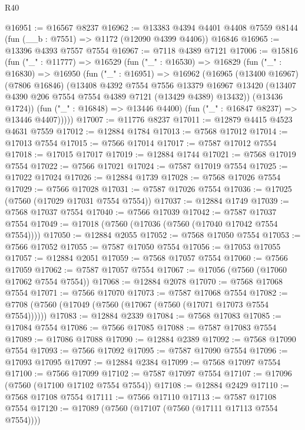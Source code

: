 \begin{lexlean}{R40}
\begin{coremodule}
@16951 := @16567 @8237
@16962 := @13383
    @4394
    @4401
    @4408
    @7559
    @8144
    (fun (__b : @7551) => @1172 (@12090 @4399 @4406))
    @16846
@16965 := @13396 @4393 @7557 @7554
@16967 := @7118 @4389 @7121
@17006 := @15816
    (fun ("_" : @11777) =>
    @16529
      (fun ("_" : @16530) =>
      @16829
        (fun ("_" : @16830) =>
        @16950
          (fun ("_" : @16951) =>
          @16962
            (@16965
              (@13400 @16967)
              (@7806 @16846)
              (@13408
                @4392
                @7554
                @7556
                @13379
                @16967
                @13420
                (@13407 @4390 @206 @7554 @7554 @4389 @7121 (@13429 @4389) @13432))
              (@13436 @1724))
            (fun ("_" : @16848) => @13446 @4400)
            (fun ("_" : @16847 @8237) => @13446 @4407)))))
@17007 := @11776 @8237
@17011 := @12879 @4415 @4523 @4631 @7559
@17012 := @12884 @1784
@17013 := @7568 @17012
@17014 := @17013 @7554
@17015 := @7566 @17014
@17017 := @7587 @17012 @7554
@17018 := @17015 @17017
@17019 := @12884 @1744
@17021 := @7568 @17019 @7554
@17022 := @7566 @17021
@17024 := @7587 @17019 @7554
@17025 := @17022 @17024
@17026 := @12884 @1739
@17028 := @7568 @17026 @7554
@17029 := @7566 @17028
@17031 := @7587 @17026 @7554
@17036 := @17025 (@7560 (@17029 @17031 @7554 @7554))
@17037 := @12884 @1749
@17039 := @7568 @17037 @7554
@17040 := @7566 @17039
@17042 := @7587 @17037 @7554
@17049 := @17018 (@7560 (@17036 (@7560 (@17040 @17042 @7554 @7554))))
@17050 := @12884 @2055
@17052 := @7568 @17050 @7554
@17053 := @7566 @17052
@17055 := @7587 @17050 @7554
@17056 := @17053 @17055
@17057 := @12884 @2051
@17059 := @7568 @17057 @7554
@17060 := @7566 @17059
@17062 := @7587 @17057 @7554
@17067 := @17056 (@7560 (@17060 @17062 @7554 @7554))
@17068 := @12884 @2078
@17070 := @7568 @17068 @7554
@17071 := @7566 @17070
@17073 := @7587 @17068 @7554
@17082 := @7708 (@7560 (@17049 (@7560 (@17067 (@7560 (@17071 @17073 @7554 @7554))))))
@17083 := @12884 @2339
@17084 := @7568 @17083
@17085 := @17084 @7554
@17086 := @7566 @17085
@17088 := @7587 @17083 @7554
@17089 := @17086 @17088
@17090 := @12884 @2389
@17092 := @7568 @17090 @7554
@17093 := @7566 @17092
@17095 := @7587 @17090 @7554
@17096 := @17093 @17095
@17097 := @12884 @2384
@17099 := @7568 @17097 @7554
@17100 := @7566 @17099
@17102 := @7587 @17097 @7554
@17107 := @17096 (@7560 (@17100 @17102 @7554 @7554))
@17108 := @12884 @2429
@17110 := @7568 @17108 @7554
@17111 := @7566 @17110
@17113 := @7587 @17108 @7554
@17120 := @17089 (@7560 (@17107 (@7560 (@17111 @17113 @7554 @7554))))

\end{coremodule}
\end{lexlean}
